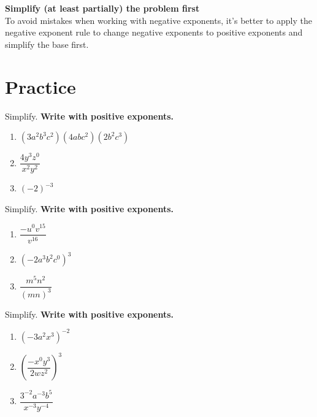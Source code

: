 \documentclass[
  en,11pt]{elegantbook}
\newcommand{\size}[2]{{\fontsize{#1}{0}\selectfont#2}}
\newenvironment{rmdtip}{
	\vspace*{0.5\baselineskip}
	\par\noindent
	\makebox[-3pt][r]{\color{red!90}\size{12}{\HandRight}\,\,}
    \begin{tcolorbox}[
    enhanced,
    title={\textbf{\color{second}Tips}},
    title style={left color=blue!10!green!20!white,right color=yellow!20!blue!20!white},
    colback=cyan!10!white,
    ]
    \sffamily
}{
    \end{tcolorbox}
    \par\ignorespacesafterend
}
\let\BeginKnitrBlock\begin \let\EndKnitrBlock\end
\begin{document}
\begin{rmdtip}

\textbf{Simplify (at least partially) the problem first}\\
To avoid mistakes when working with negative exponents, it's better to apply the negative exponent rule to change negative exponents to positive exponents and simplify the base first.

\end{rmdtip}

\newpage

\hypertarget{practice}{%
\section{Practice}\label{practice}}

\BeginKnitrBlock{exercise}
\protect\hypertarget{exr:unnamed-chunk-4}{}{\label{exr:unnamed-chunk-4} }
Simplify. \textbf{Write with positive exponents.}

\begin{enumerate}
\def\labelenumi{\arabic{enumi}.}

\item
  \((3a^2b^3c^2)(4abc^2)(2b^2c^3)\)
\item
  \(\dfrac{4y^3z^0}{x^2y^2}\)
\item
  \((-2)^{-3}\)
\end{enumerate}
\EndKnitrBlock{exercise}

\BeginKnitrBlock{exercise}
\protect\hypertarget{exr:unnamed-chunk-5}{}{\label{exr:unnamed-chunk-5} }
Simplify. \textbf{Write with positive exponents.}

\begin{enumerate}
\def\labelenumi{\arabic{enumi}.}

\item
  \(\dfrac{-u^0v^{15}}{v^{16}}\)
\item
  \((-2a^3b^2c^0)^3\)
\item
  \(\dfrac{m^5 n^{2}}{(mn)^3}\)
\end{enumerate}
\EndKnitrBlock{exercise}

\BeginKnitrBlock{exercise}
\protect\hypertarget{exr:unnamed-chunk-6}{}{\label{exr:unnamed-chunk-6} }
Simplify. \textbf{Write with positive exponents.}

\begin{enumerate}
\def\labelenumi{\arabic{enumi}.}

\item
  \((-3a^2x^3)^{-2}\)
\item
  \(\left(\dfrac{-x^0y^3}{2wz^2}\right)^3\)
\item
  \(\dfrac{3^{-2}a^{-3}b^5}{x^{-3}y^{-4}}\)
\end{enumerate}
\EndKnitrBlock{exercise}
\end{document}

